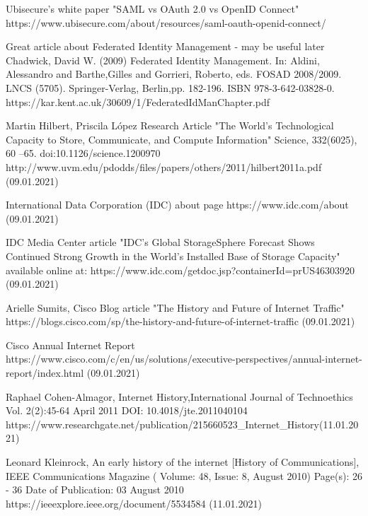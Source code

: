 \documentclass[magisterska,en]{pracamgr}
\begin{document}
\begin{thebibliography}{9}
Ubisecure's white paper "SAML vs OAuth 2.0 vs OpenID Connect"
https://www.ubisecure.com/about/resources/saml-oauth-openid-connect/

Great article about Federated Identity Management - may be useful later
Chadwick, David W.  (2009) Federated Identity Management.    In: Aldini, Alessandro and Barthe,Gilles and Gorrieri, Roberto, eds. FOSAD 2008/2009.   LNCS  (5705).  Springer-Verlag, Berlin,pp. 182-196. ISBN 978-3-642-03828-0.
https://kar.kent.ac.uk/30609/1/FederatedIdManChapter.pdf
 
Martin Hilbert, Priscila López
Research Article "The World’s Technological Capacity to Store, Communicate, and Compute Information" Science, 332(6025), 60 –65. doi:10.1126/science.1200970
http://www.uvm.edu/pdodds/files/papers/others/2011/hilbert2011a.pdf (09.01.2021)

International Data Corporation (IDC) about page
https://www.idc.com/about (09.01.2021)

IDC Media Center article "IDC's Global StorageSphere Forecast Shows Continued Strong Growth in the World's Installed Base of Storage Capacity" available online at: https://www.idc.com/getdoc.jsp?containerId=prUS46303920 (09.01.2021)

Arielle Sumits, Cisco Blog article "The History and Future of Internet Traffic"
https://blogs.cisco.com/sp/the-history-and-future-of-internet-traffic (09.01.2021)

Cisco Annual Internet Report
https://www.cisco.com/c/en/us/solutions/executive-perspectives/annual-internet-report/index.html (09.01.2021)

Raphael Cohen-Almagor, Internet History,International Journal of Technoethics Vol. 2(2):45-64
April 2011 
DOI: 10.4018/jte.2011040104
https://www.researchgate.net/publication/215660523\_Internet\_History(11.01.2021)



Leonard Kleinrock, An early history of the internet [History of Communications],  IEEE Communications Magazine ( Volume: 48, Issue: 8, August 2010) Page(s): 26 - 36
Date of Publication: 03 August 2010 
https://ieeexplore.ieee.org/document/5534584 (11.01.2021)
 
\end{thebibliography}
\end{document}
